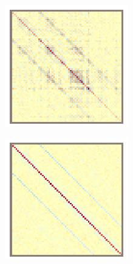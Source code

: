 \begin{figure}
    \begin{subfigure}{\textwidth/4}
		  \includegraphics[width=\linewidth]{figures/stbf_struct/covs-3.eps}
      \caption{}
    \end{subfigure}\hfill%
    \begin{subfigure}{\textwidth/4}
		  \includegraphics[width=\linewidth]{figures/stbf_struct/covs-4.eps}

\end{subfigure}
\end{figure}
